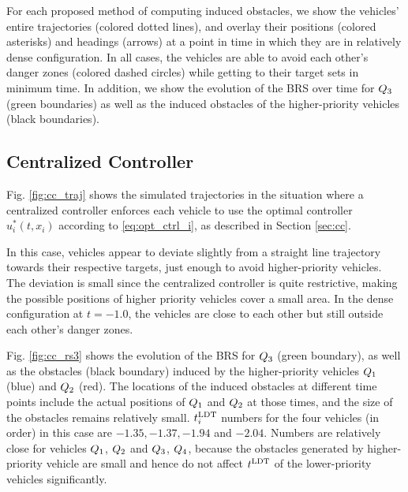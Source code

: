 For each proposed method of computing induced obstacles, we show the vehicles' entire trajectories (colored dotted lines), and overlay their positions (colored asterisks) and headings (arrows) at a point in time in which they are in relatively dense configuration. In all cases, the vehicles are able to avoid each other's danger zones (colored dashed circles) while getting to their target sets in minimum time. In addition, we show the evolution of the BRS over time for $Q_3$ (green boundaries) as well as the induced obstacles of the higher-priority vehicles (black boundaries).

\subsection{Centralized Controller}
Fig. \ref{fig:cc_traj} shows the simulated trajectories in the situation where a centralized controller enforces each vehicle to use the optimal controller $u^*_i(t, x_i)$ according to \eqref{eq:opt_ctrl_i}, as described in Section \ref{sec:cc}.

In this case, vehicles appear to deviate slightly from a straight line trajectory towards their respective targets, just enough to avoid higher-priority vehicles. The deviation is small since the centralized controller is quite restrictive, making the possible positions of higher priority vehicles cover a small area. In the dense configuration at $t=-1.0$, the vehicles are close to each other but still outside each other's danger zones.

Fig. \ref{fig:cc_rs3} shows the evolution of the BRS for $Q_3$ (green boundary), as well as the obstacles (black boundary) induced by the higher-priority vehicles $Q_1$ (blue) and $Q_2$ (red). The locations of the induced obstacles at different time points include the actual positions of $Q_1$ and $Q_2$ at those times, and the size of the obstacles remains relatively small. $t^\text{LDT}_i$ numbers for the four vehicles (in order) in this case are $-1.35, -1.37, -1.94$ and $-2.04$. Numbers are relatively close for vehicles $Q_1$, $Q_2$ and $Q_3$, $Q_4$, because the obstacles generated by higher-priority vehicle are small and hence do not affect $t^\text{LDT}$ of the lower-priority vehicles significantly. 

